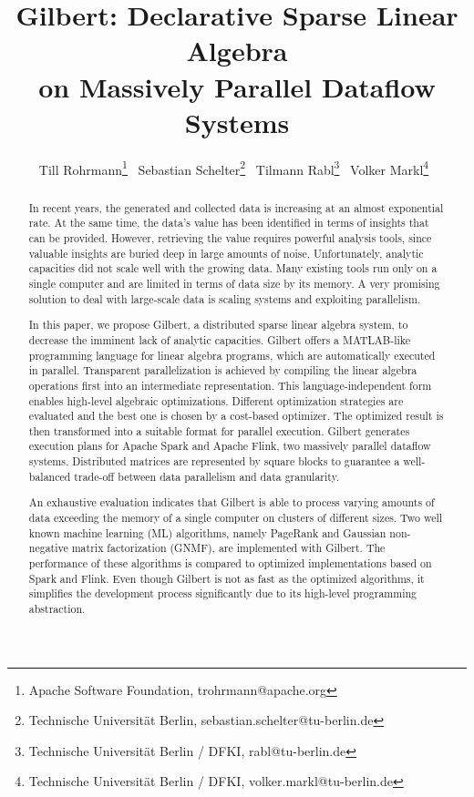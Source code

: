 \documentclass[english]{lni}
\author{
Till Rohrmann\footnote{Apache Software Foundation, trohrmann@apache.org} \, %
Sebastian Schelter\footnote{Technische Universität Berlin, sebastian.schelter@tu-berlin.de} \, %
Tilmann Rabl\footnote{Technische Universität Berlin / DFKI, rabl@tu-berlin.de} \, %
Volker Markl\footnote{Technische Universität Berlin / DFKI, volker.markl@tu-berlin.de} \, %
}
\title{Gilbert: Declarative Sparse Linear Algebra\\ on Massively Parallel Dataflow Systems}
\begin{document}
\maketitle

\thispagestyle{lnifirstpage}
\pagestyle{lni}

\setcounter{footnote}{2}

\begin{abstract}
In recent years, the generated and collected data is increasing at an almost exponential rate. 
At the same time, the data's value has been identified in terms of insights that can be provided. 
However, retrieving the value requires powerful analysis tools, since valuable insights are buried deep in large amounts of noise. 
Unfortunately, analytic capacities did not scale well with the growing data. 
Many existing tools run only on a single computer and are limited in terms of data size by its memory. 
A very promising solution to deal with large-scale data is scaling systems and exploiting parallelism.

In this paper, we propose Gilbert, a distributed sparse linear algebra system, to decrease the imminent lack of analytic capacities. 
Gilbert offers a MATLAB\textsuperscript{\textregistered}-like programming language for linear algebra programs, which are automatically executed in parallel. 
Transparent parallelization is achieved by compiling the linear algebra operations first into an intermediate representation. 
This language-independent form enables high-level algebraic optimizations.
Different optimization strategies are evaluated and the best one is chosen by a cost-based optimizer. 
The optimized result is then transformed into a suitable format for parallel execution. 
Gilbert generates execution plans for Apache Spark\textsuperscript{\textregistered} and Apache Flink\textsuperscript{\textregistered}, two massively parallel dataflow systems. 
Distributed matrices are represented by square blocks to guarantee a well-balanced trade-off between data parallelism and data granularity.

An exhaustive evaluation indicates that Gilbert is able to process varying amounts of data exceeding the memory of a single computer on clusters of different sizes.
Two well known machine learning (ML) algorithms, namely PageRank and Gaussian non-negative matrix factorization (GNMF), are implemented with Gilbert. 
The performance of these algorithms is compared to optimized implementations based on Spark and Flink. 
Even though Gilbert is not as fast as the optimized algorithms, it simplifies the development process significantly due to its high-level programming abstraction.
\end{abstract}
\end{document}

